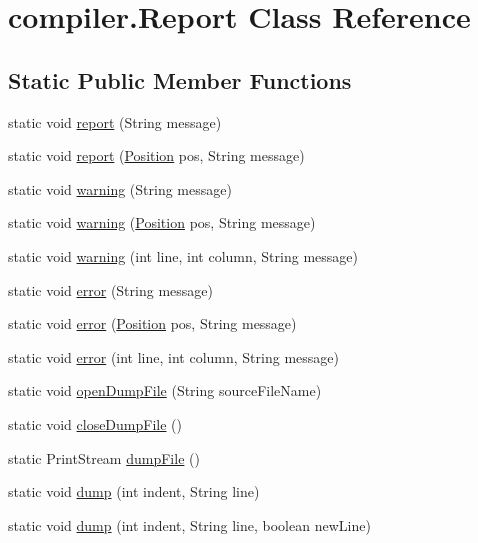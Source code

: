 \hypertarget{classcompiler_1_1_report}{}\section{compiler.\+Report Class Reference}
\label{classcompiler_1_1_report}
\subsection*{Static Public Member Functions}
\begin{DoxyCompactItemize}
\item 
static void \hyperlink{classcompiler_1_1_report_ad913b6bd4c1c19b97b79e3ceda6c9f62}{report} (String message)
\item 
static void \hyperlink{classcompiler_1_1_report_a2163c1c6dbc01e8987c0b4251f088e95}{report} (\hyperlink{classcompiler_1_1_position}{Position} pos, String message)
\item 
static void \hyperlink{classcompiler_1_1_report_aaaf44479dfb4447701bc328f1aa4b9e6}{warning} (String message)
\item 
static void \hyperlink{classcompiler_1_1_report_a2054144e10ddb3a152b942db6b6d6f23}{warning} (\hyperlink{classcompiler_1_1_position}{Position} pos, String message)
\item 
static void \hyperlink{classcompiler_1_1_report_a36143b5691657adee5185b83b6f11a65}{warning} (int line, int column, String message)
\item 
static void \hyperlink{classcompiler_1_1_report_adb06e20323dbb6ec6ce2ebda5beea015}{error} (String message)
\item 
static void \hyperlink{classcompiler_1_1_report_aad79ddd080cb6ab9db966cc6abdb2948}{error} (\hyperlink{classcompiler_1_1_position}{Position} pos, String message)
\item 
static void \hyperlink{classcompiler_1_1_report_a0695b6426e0642bf621515e73c4db665}{error} (int line, int column, String message)
\item 
static void \hyperlink{classcompiler_1_1_report_a905c84b3ef9a4d6d34660eb93c656e45}{open\+Dump\+File} (String source\+File\+Name)
\item 
static void \hyperlink{classcompiler_1_1_report_a8a76f56cadc23366cf744a99a8db9824}{close\+Dump\+File} ()
\item 
static Print\+Stream \hyperlink{classcompiler_1_1_report_aa10de6f639112a99db22127b061a930b}{dump\+File} ()
\item 
static void \hyperlink{classcompiler_1_1_report_aaf3b3d2a725b3971cbafbedf87f6aae8}{dump} (int indent, String line)
\item 
static void \hyperlink{classcompiler_1_1_report_a84d964f5534f33b9941dc076a2850080}{dump} (int indent, String line, boolean new\+Line)
\end{DoxyCompactItemize}
